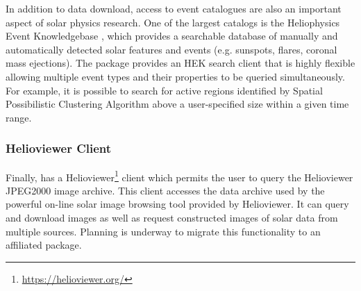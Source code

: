 In addition to data download, access to event catalogues are also an important aspect of solar physics research.
One of the largest catalogs is the Heliophysics Event Knowledgebase \citep[HEK,][]{hek}, which provides a searchable database of manually and automatically detected solar features and events (e.g. sunspots, flares, coronal mass ejections). The \sunpypkg package provides an HEK search client that is highly flexible allowing multiple event types and their properties to be queried simultaneously.
For example, it is possible to search for active regions identified by Spatial Possibilistic Clustering Algorithm \citep[SPoCA,][]{2014AA...561A..29V} above a user-specified size within a given time range.

\subsubsection{Helioviewer Client}
\label{sec:helioviewer}

Finally,  has a Helioviewer\footnote{\url{https://helioviewer.org/}} client which permits the user to query the Helioviewer JPEG2000 image archive.
This client accesses the data archive used by the powerful on-line solar image browsing tool provided by Helioviewer.
It can query and download images as well as request constructed images of solar data from multiple sources.
Planning is underway to migrate this functionality to an affiliated package.
